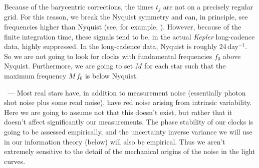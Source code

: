 \documentclass{article}
\renewcommand{\paragraph}[1]{\medskip\par\noindent{\textbf{#1}}~---}
\begin{document}
Because of the barycentric corrections, the times $t_j$ are not on a precisely regular grid.
For this reason, we break the Nyquist symmetry and can, in principle, see frequencies higher than Nyquist (see, for example, \cite{supernyquist}).
However, because of the finite integration time, these signals tend to be, in the actual \textsl{Kepler} long-cadence data, highly suppressed.
In the long-cadence data, Nyquist is roughly 24\,day$^{-1}$.
So we are not going to look for clocks with fundamental frequencies $f_0$ above Nyquist.
Furthermore, we are going to set $M$ for each star such that the maximum frequency $M\,f_0$ is below Nyquist.

\paragraph{Red noise and noise model}
Most real stars have, in addition to measurement noise (essentially photon shot noise plus some read noise), have red noise arising from intrinsic variability.
Here we are going to assume not that this doesn't exist, but rather that it doesn't affect significantly our measurements.
The phase stability of our clocks is going to be assessed empirically, and the uncertainty inverse variance we will use in our information theory (below) will also be empirical.
Thus we aren't extremely sensitive to the detail of the mechanical origins of the noise in the light curves.
\end{document}
